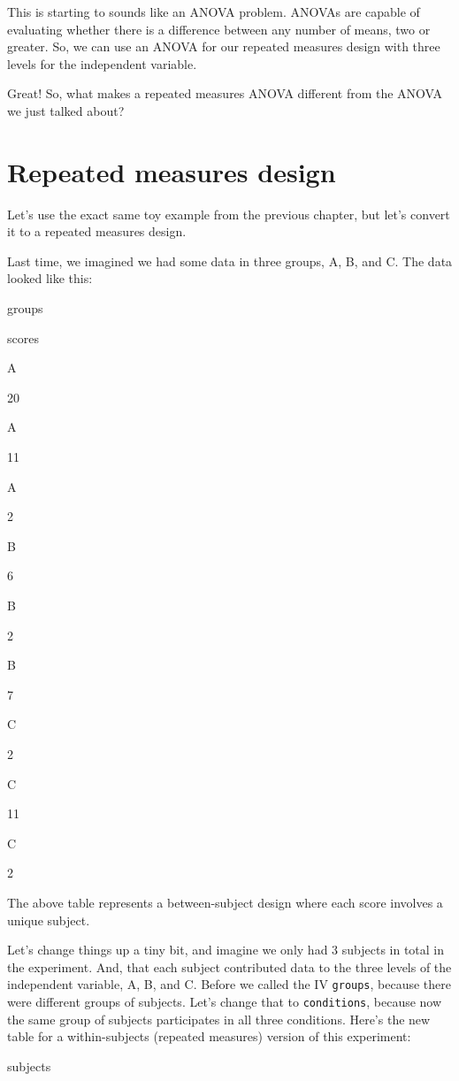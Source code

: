 \documentclass[
]{book}
\begin{document}
This is starting to sounds like an ANOVA problem. ANOVAs are capable of evaluating whether there is a difference between any number of means, two or greater. So, we can use an ANOVA for our repeated measures design with three levels for the independent variable.

Great! So, what makes a repeated measures ANOVA different from the ANOVA we just talked about?

\hypertarget{repeated-measures-design}{%
\section{Repeated measures design}\label{repeated-measures-design}}

Let's use the exact same toy example from the previous chapter, but let's convert it to a repeated measures design.

Last time, we imagined we had some data in three groups, A, B, and C. The data looked like this:

groups

scores

A

20

A

11

A

2

B

6

B

2

B

7

C

2

C

11

C

2

The above table represents a between-subject design where each score involves a unique subject.

Let's change things up a tiny bit, and imagine we only had 3 subjects in total in the experiment. And, that each subject contributed data to the three levels of the independent variable, A, B, and C. Before we called the IV \texttt{groups}, because there were different groups of subjects. Let's change that to \texttt{conditions}, because now the same group of subjects participates in all three conditions. Here's the new table for a within-subjects (repeated measures) version of this experiment:

subjects
\end{document}
